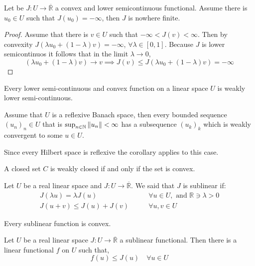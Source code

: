 \begin{lemma}
	Let be $J: U \rightarrow \overline{\mathbb{R}}$ a convex and lower semicontinuous functional. Assume there is $u_0 \in U$ such that $J(u_0)=-\infty$, then $J$ is nowhere finite.
	\begin{proof}
		Assume that there is $v\in U$ such that $-\infty< J(v)< \infty$. Then by convexity $J(\lambda u_0 + (1-\lambda)v)=- \infty$, $\forall \lambda \in [0,1]$. Because $J$ is lower semicontinuos it follows that in the limit $\lambda \rightarrow 0$, 
		\[
			(\lambda u_0 +(1-\lambda)v) \rightarrow v \implies J(v)\leq J(\lambda u_0 +(1-\lambda)v)=-\infty
		\]
	\end{proof}
\end{lemma}
\begin{lemma}
	Every lower semi-continuous and convex function on a linear space $U$ is weakly lower semi-continuous.
\end{lemma}

\begin{corollary}
	Assume that $U$ is a reflexive Banach space, then every bounded sequence $(u_n)_n \in U$ that is $\sup_{n\in \mathbb{N}} \left\lVert u_n\right\rVert<\infty$ has a subsequence $(u_k)_k$ which is weakly convergent to some $u\in U$. 
\end{corollary}

\begin{remark}
	Since every Hilbert space is reflexive the corollary applies to this case.
\end{remark}

\begin{lemma}
	A closed set $C$ is weakly closed if and only if the set is convex.
\end{lemma}

\begin{definition}
	Let $U$ be a real linear space and $J:U\rightarrow \overline{\mathbb{R}}$. We said that $J$ is sublinear if:
	\begin{align*}
		J(\lambda u)=\lambda J(u) & \qquad  \forall u \in U, \text{ and } \mathbb{R}\ni \lambda>0 \\
		J(u+v)\leq J(u)+J(v) & \qquad \forall u, v \in U
	\end{align*}
	\begin{remark}
		Every sublinear function is convex.
	\end{remark}
\end{definition}
\begin{theorem}
	Let $U$ be a real linear space $J: U\rightarrow \overline{\mathbb{R}}$ a sublinear functional. Then there is a linear functional $f$ on $U$ such that,
	\[
		f(u)\leq J(u) \quad \forall u \in U
	\]
\end{theorem}

